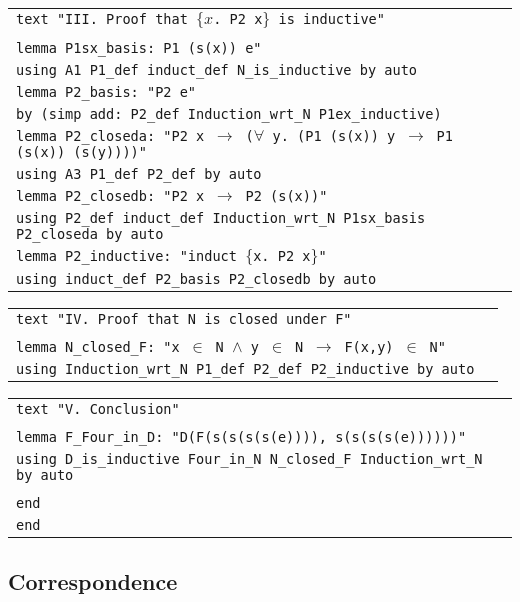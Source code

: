 \documentclass[11pt,a4paper]{article}
\newcommand{\bt}[2]{\small \begin{center}\begin{tabular}{p{#1 cm}p{#2 cm}}}
\def\et{\end{tabular}\end{center}\normalsize}
\theoremstyle{definition}
\begin{document}
\bt{14}{0}
\texttt{text "III. Proof that $\{x$. P2 x$\}$ is inductive"}\\
\\
\texttt{lemma P1sx\_basis: P1 (s(x)) e"} \\
 \hspace{3mm} \texttt{using A1 P1\_def induct\_def N\_is\_inductive by auto}\\
\texttt{lemma P2\_basis: "P2 e"} \\
 \hspace{3mm} \texttt{by (simp add: P2\_def Induction\_wrt\_N P1ex\_inductive)}\\
\texttt{lemma P2\_closeda: "P2 x $\longrightarrow$ ($\forall$ y. (P1 (s(x)) y $\longrightarrow$ P1 (s(x)) (s(y))))"} \\
\hspace{3mm} \texttt{using A3 P1\_def P2\_def by auto}\\
\texttt{lemma P2\_closedb: "P2 x $\longrightarrow$ P2 (s(x))"} \\ 
 \hspace{3mm} \texttt{using P2\_def induct\_def Induction\_wrt\_N P1sx\_basis P2\_closeda by auto}\\
\texttt{lemma P2\_inductive: "induct $\{$x. P2 x$\}$"} \\ 
\hspace{3mm} \texttt{using induct\_def P2\_basis P2\_closedb by auto}
\et

\bt{14}{0}

\texttt{text "IV. Proof that N is closed under F"}\\
\\
\texttt{lemma N\_closed\_F: "x $\in$ N $\wedge$ y $\in$ N $\longrightarrow$ F(x,y) $\in$ N"} \\
\hspace{3mm} \texttt{using Induction\_wrt\_N P1\_def P2\_def P2\_inductive by auto}
\et

\bt{14}{0}

\texttt{text "V. Conclusion"}\\
\\
\texttt{lemma F\_Four\_in\_D: "D(F(s(s(s(s(e)))), s(s(s(s(e))))))"} \\
\hspace{3mm}\texttt{using D\_is\_inductive Four\_in\_N N\_closed\_F Induction\_wrt\_N by auto}\\
\\
\texttt{end}\\
\texttt{end}
\et

\subsection{Correspondence}
\end{document}

